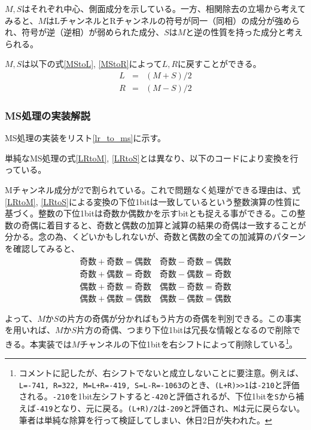 \documentclass[uplatex,dvipdfmx,b5j,10pt]{jsbook}
\theoremstyle{definition}
\begin{document}
$M,S$はそれぞれ中心、側面成分を示している。一方、相関除去の立場から考えてみると、$M$はLチャンネルとRチャンネルの符号が同一（同相）の成分が強められ、符号が逆（逆相）が弱められた成分、$S$は$M$と逆の性質を持った成分と考えられる。

$M,S$は以下の式\ref{MStoL}, \ref{MStoR}によって$L,R$に戻すことができる。
\begin{eqnarray}
  L &=& (M + S) / 2 \label{MStoL} \\
  R &=& (M - S) / 2 \label{MStoR}
\end{eqnarray}

\subsubsection{MS処理の実装解説}

MS処理の実装をリスト\ref{lr_to_ms}に示す。


単純なMS処理の式\ref{LRtoM}, \ref{LRtoS}とは異なり、以下のコードにより変換を行っている。


Mチャンネル成分が2で割られている。これで問題なく処理ができる理由は、式\ref{LRtoM}, \ref{LRtoS}による変換の下位1bitは一致しているという整数演算の性質に基づく。整数の下位1bitは奇数か偶数かを示すbitとも捉える事ができる。この整数の奇偶に着目すると、奇数と偶数の加算と減算の結果の奇偶は一致することが分かる。念の為、くどいかもしれないが、奇数と偶数の全ての加減算のパターンを確認してみると、
\begin{eqnarray*}
  奇数 + 奇数 = 偶数 \quad 奇数 - 奇数 = 偶数 \\
  奇数 + 偶数 = 奇数 \quad 奇数 - 偶数 = 奇数 \\
  偶数 + 奇数 = 奇数 \quad 偶数 - 奇数 = 奇数 \\
  偶数 + 偶数 = 偶数 \quad 偶数 - 偶数 = 偶数
\end{eqnarray*}

よって、$M$か$S$の片方の奇偶が分かればもう片方の奇偶を判別できる。この事実を用いれば、$M$か$S$片方の奇偶、つまり下位1bitは冗長な情報となるので削除できる。本実装では$M$チャンネルの下位1bitを右シフトによって削除している\footnote{コメントに記したが、右シフトでないと成立しないことに要注意。例えば、\texttt{L=-741, R=322, M=L+R=-419, S=L-R=-1063}のとき、\texttt{(L+R)>>1}は\texttt{-210}と評価される。\texttt{-210}を1bit左シフトすると\texttt{-420}と評価されるが、下位1bitを\texttt{S}から補えば\texttt{-419}となり、元に戻る。\texttt{(L+R)/2}は\texttt{-209}と評価され、\texttt{M}は元に戻らない。筆者は単純な除算を行って検証してしまい、休日2日が失われた。}。
\end{document}
